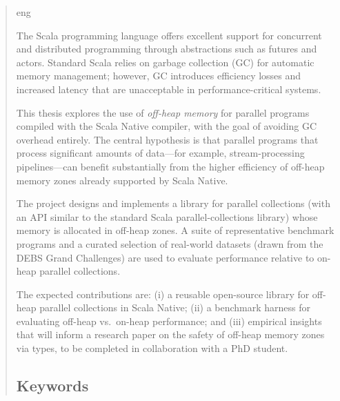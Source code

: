\documentclass[
  english,   %
  bibtex,    %
]{kththesis}
\begin{document}

\kthcover
\clearpage\thispagestyle{empty}\mbox{}
\titlepage
\bookinfopage

\frontmatter
\setcounter{page}{1}

\begin{abstract}
  \markboth{\abstractname}{}
\begin{scontents}[store-env=lang]
eng
\end{scontents}
\begin{scontents}[store-env=abstracts,print-env=true]

The Scala programming language offers excellent support for concurrent and
distributed programming through abstractions such as futures and actors.
Standard Scala relies on garbage collection (GC) for automatic memory
management; however, GC introduces efficiency losses and increased latency
that are unacceptable in performance-critical systems.

This thesis explores the use of \textit{off-heap memory} for parallel programs
compiled with the Scala Native compiler, with the goal of avoiding GC overhead
entirely.  The central hypothesis is that parallel programs that process
significant amounts of data---for example, stream-processing pipelines---can
benefit substantially from the higher efficiency of off-heap memory zones
already supported by Scala Native.

The project designs and implements a library for parallel collections (with an
\gls{API} similar to the standard Scala parallel-collections library) whose
memory is allocated in off-heap zones.  A suite of representative benchmark
programs and a curated selection of real-world datasets (drawn from the
\gls{DEBS} Grand Challenges) are used to evaluate performance relative to
on-heap parallel collections.

The expected contributions are: (i) a reusable open-source library for
off-heap parallel collections in Scala Native; (ii) a benchmark harness for
evaluating off-heap vs.\ on-heap performance; and (iii) empirical insights
that will inform a research paper on the safety of off-heap memory zones via
types, to be completed in collaboration with a PhD student.

\end{scontents}

\subsection*{Keywords}
\begin{scontents}[store-env=keywords,print-env=true]
\end{scontents}
\end{abstract}
\end{document}
